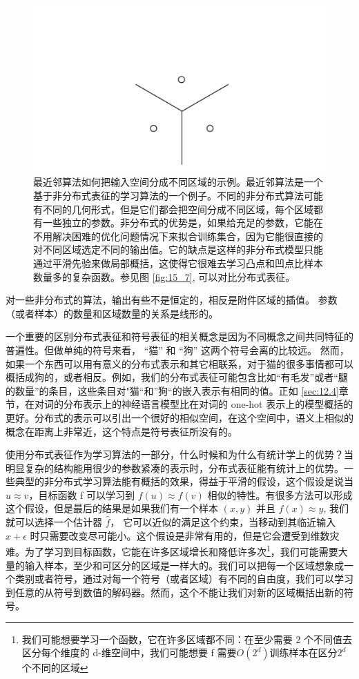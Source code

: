 \begin{figure}[h!]
\centering
\includegraphics[width=13cm]{fig/chap15/15_8.png}
\caption{最近邻算法如何把输入空间分成不同区域的示例。最近邻算法是一个基于非分布式表征的学习算法的一个例子。不同的非分布式算法可能有不同的几何形式，但是它们都会把空间分成不同区域，每个区域都有一些独立的参数。非分布式的优势是，如果给充足的参数，它能在不用解决困难的优化问题情况下来拟合训练集合，因为它能很直接的对不同区域选定不同的输出值。它的缺点是这样的非分布式模型只能通过平滑先验来做局部概括，这使得它很难去学习凸点和凹点比样本数量多的复杂函数。参见图 \ref{fig:15_7}, 可以对比分布式表征。}
\label{fig:15_8}
\end{figure}

对一些非分布式的算法，输出有些不是恒定的，相反是附件区域的插值。 参数（或者样本）的数量和区域数量的关系是线形的。

一个重要的区别分布式表征和符号表征的相关概念是因为不同概念之间共同特征的普遍性。但做单纯的符号来看， “猫” 和 “狗” 这两个符号会离的比较远。 然而，如果一个东西可以用有意义的分布式表示和其它相联系，对于猫的很多事情都可以概括成狗的，或者相反。例如，我们的分布式表征可能包含比如“有毛发”或者“腿的数量”的条目，这些条目对"猫“和”狗“的嵌入表示有相同的值。正如 \ref{sec:12.4}章节，在对词的分布表示上的神经语言模型比在对词的 one-hot 表示上的模型概括的更好。分布式的表示可以引出一个很好的相似空间，在这个空间中，语义上相似的概念在距离上非常近，这个特点是符号表征所没有的。

使用分布式表征作为学习算法的一部分，什么时候和为什么有统计学上的优势？当明显复杂的结构能用很少的参数紧凑的表示时，分布式表征能有统计上的优势。一些典型的非分布式学习算法能有概括的效果，得益于平滑的假设，这个假设是说当 $u \approx v$，目标函数 f 可以学习到 $f(u) \approx f(v)$ 相似的特性。有很多方法可以形成这个假设，但是最后的结果是如果我们有一个样本 $(x, y)$ 并且 $f(x) \approx y$, 我们就可以选择一个估计器 $\hat{f}$， 它可以近似的满足这个约束，当移动到其临近输入 $x+\epsilon$ 时只需要改变尽可能小。这个假设是非常有用的，但是它会遭受到维数灾难。为了学习到目标函数，它能在许多区域增长和降低许多次\footnote{我们可能想要学习一个函数，它在许多区域都不同：在至少需要 2 个不同值去区分每个维度的 d-维空间中，我们可能想要 f 需要$O(2^d)$训练样本在区分$2^d$个不同的区域}，我们可能需要大量的输入样本，至少和可区分的区域是一样大的。我们可以把每一个区域想象成一个类别或者符号，通过对每一个符号（或者区域）有不同的自由度，我们可以学习到任意的从符号到数值的解码器。然而，这个不能让我们对新的区域概括出新的符号。

